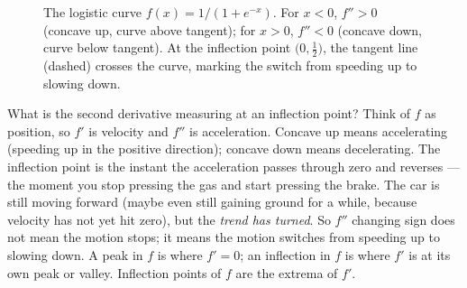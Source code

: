 \begin{figure}[H]
\centering
{}
\caption{The logistic curve $f(x)=1/(1+e^{-x})$. For $x<0$, $f''>0$ (concave up,
curve above tangent); for $x>0$, $f''<0$ (concave down, curve below tangent).
At the inflection point $\big(0,\tfrac12\big)$, the tangent line (dashed)
crosses the curve, marking the switch from speeding up to slowing down.}
\label{ch16:fig-logistic}
\end{figure}

\begin{happeningbox}
What is the second derivative measuring at an inflection point?
Think of $f$ as position, so $f'$ is velocity and $f''$ is acceleration. Concave up
means accelerating (speeding up in the positive direction); concave down means
decelerating. The inflection point is the instant the acceleration passes through
zero and reverses --- the moment you stop pressing the gas and start pressing the
brake. The car is still moving forward (maybe even still gaining ground for a
while, because velocity has not yet hit zero), but the \emph{trend has turned}.
So $f''$ changing sign does not mean the motion stops; it means the motion
switches from speeding up to slowing down. A peak in $f$ is where $f'=0$; an
inflection in $f$ is where $f'$ is at its own peak or valley. Inflection points of
$f$ are the extrema of $f'$.
\end{happeningbox}

